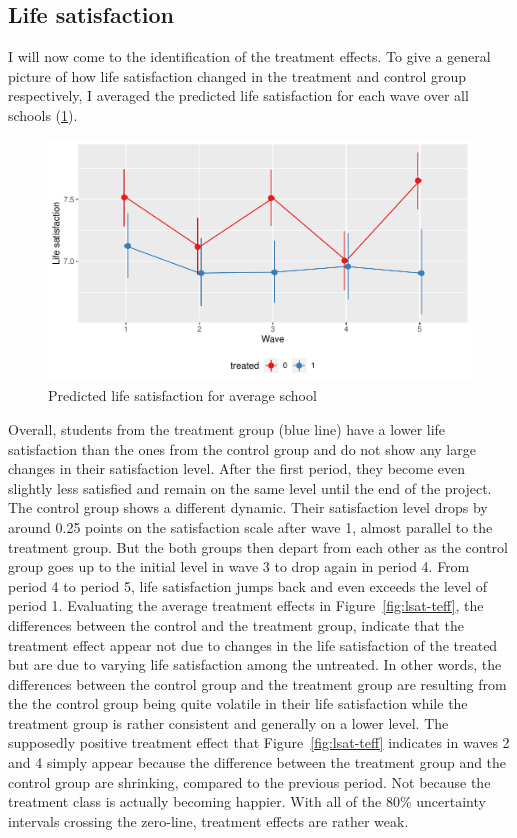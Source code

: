 \documentclass[a4, 12pt]{article}
\begin{document}
\hypertarget{life-satisfaction}{%
\subsection{Life satisfaction}\label{life-satisfaction}}

\label{sec:life-satisfaction}
I will now come to the identification of the treatment effects. To give a general picture of how life satisfaction changed in the treatment and control group respectively, I averaged the predicted life satisfaction for each wave over all schools (\ref{fig:lsat-pred}).

\begin{figure}[H]

{\centering \includegraphics[width=0.8\linewidth,]{../figures/lsat_pred} 

}

\caption{Predicted life satisfaction for average school}\label{fig:lsat-pred}
\end{figure}

Overall, students from the treatment group (blue line) have a lower life satisfaction than the ones from the control group and do not show any large changes in their satisfaction level. After the first period, they become even slightly less satisfied and remain on the same level until the end of the project. The control group shows a different dynamic. Their satisfaction level drops by around 0.25 points on the satisfaction scale after wave 1, almost parallel to the treatment group. But the both groups then depart from each other as the control group goes up to the initial level in wave 3 to drop again in period 4. From period 4 to period 5, life satisfaction jumps back and even exceeds the level of period 1. Evaluating the average treatment effects in Figure~\ref{fig:lsat-teff}, the differences between the control and the treatment group, indicate that the treatment effect appear not due to changes in the life satisfaction of the treated but are due to varying life satisfaction among the untreated. In other words, the differences between the control group and the treatment group are resulting from the the control group being quite volatile in their life satisfaction while the treatment group is rather consistent and generally on a lower level. The supposedly positive treatment effect that Figure~\ref{fig:lsat-teff} indicates in waves 2 and 4 simply appear because the difference between the treatment group and the control group are shrinking, compared to the previous period. Not because the treatment class is actually becoming happier. With all of the 80\% uncertainty intervals crossing the zero-line, treatment effects are rather weak.
\end{document}
